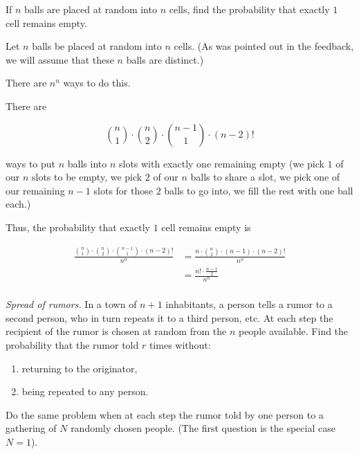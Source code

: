 \begin{problem}[Handout 2, \# 12]
  If \(n\) balls are placed at random into \(n\) cells, find the
  probability that exactly \(1\) cell remains empty.
\end{problem}
\begin{solution}
Let $n$ balls be placed at random into $n$ cells. (As was pointed out in the feedback, we will assume that these $n$ balls are distinct.)

There are $n^n$ ways to do this.

There are

\[
\binom{n}{1} \cdot \binom{n}{2} \cdot \binom{n-1}{1} \cdot (n-2)!
\]

ways to put $n$ balls into $n$ slots with exactly one remaining empty (we pick $1$ of our $n$ slots to be empty, we pick $2$ of our $n$ balls to share a slot, we pick one of our remaining $n-1$ slots for those $2$ balls to go into, we fill the rest with one ball each.)

Thus, the probability that exactly $1$ cell remains empty is

\begin{align*}
\frac{\binom{n}{1} \cdot \binom{n}{2} \cdot \binom{n-1}{1} \cdot (n-2)!}{n^n} &= \frac{n \cdot \binom{n}{2} \cdot (n-1) \cdot (n-2)!}{n^n} \\
&= \frac{n! \cdot \frac{n-1}{2}}{n^n} \\
\end{align*}
\end{solution}
\newpage


\begin{problem}[Handout 2, \# 13]
  \emph{Spread of rumors.} In a town of \(n+1\) inhabitants, a person tells
  a rumor to a second person, who in turn repeats it to a third person,
  etc. At each step the recipient of the rumor is chosen at random from the
  \(n\) people available. Find the probability that the rumor told \(r\)
  times without:
  \begin{enumerate}[label=(\alph*),noitemsep]
  \item returning to the originator,
  \item being repeated to any person.
  \end{enumerate}
  Do the same problem when at each step the rumor told by one person to a
  gathering of \(N\) randomly chosen people. (The first question is the
  special case \(N=1\)).
\end{problem}
\begin{solution}

\end{solution}
\newpage

